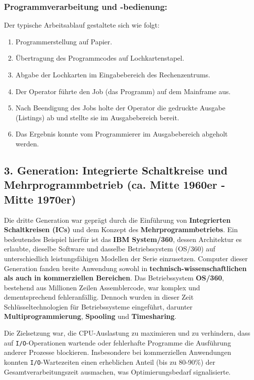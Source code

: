 \subsubsection*{Programmverarbeitung und -bedienung:}
Der typische Arbeitsablauf gestaltete sich wie folgt:
\begin{enumerate}
    \item Programmerstellung auf Papier.
    \item Übertragung des Programmcodes auf Lochkartenstapel.
    \item Abgabe der Lochkarten im Eingabebereich des Rechenzentrums.
    \item Der Operator führte den Job (das Programm) auf dem Mainframe aus.
    \item Nach Beendigung des Jobs holte der Operator die gedruckte Ausgabe (Listings) ab
          und stellte sie im Ausgabebereich bereit.
    \item Das Ergebnis konnte vom Programmierer im Ausgabebereich abgeholt werden.
\end{enumerate}

\subsection{3. Generation: Integrierte Schaltkreise und Mehrprogrammbetrieb (ca. Mitte 1960er - Mitte 1970er)}

Die dritte Generation war geprägt durch die Einführung von \textbf{Integrierten
    Schaltkreisen (ICs)} und dem Konzept des \textbf{Mehrprogrammbetriebs}. Ein
bedeutendes Beispiel hierfür ist das \textbf{IBM System/360}, dessen
Architektur es erlaubte, dieselbe Software und dasselbe Betriebssystem (OS/360)
auf unterschiedlich leistungsfähigen Modellen der Serie einzusetzen. Computer
dieser Generation fanden breite Anwendung sowohl in
\textbf{technisch-wissenschaftlichen als auch in kommerziellen Bereichen}. Das
Betriebssystem \textbf{OS/360}, bestehend aus Millionen Zeilen Assemblercode,
war komplex und dementsprechend fehleranfällig. Dennoch wurden in dieser Zeit
Schlüsseltechnologien für Betriebssysteme eingeführt, darunter
\textbf{Multiprogrammierung}, \textbf{Spooling} und \textbf{Timesharing}.

Die Zielsetzung war, die CPU-Auslastung zu maximieren und zu verhindern, dass
auf \texttt{I/O}-Operationen wartende oder fehlerhafte Programme die Ausführung
anderer Prozesse blockieren. Insbesondere bei kommerziellen Anwendungen konnten
\texttt{I/O}-Wartezeiten einen erheblichen Anteil (bis zu 80-90\%) der
Gesamtverarbeitungszeit ausmachen, was Optimierungsbedarf signalisierte.

